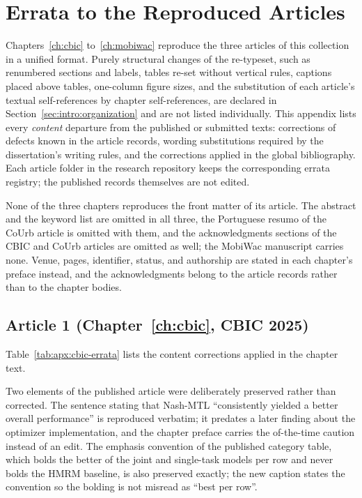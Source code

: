 
\chapter{Errata to the Reproduced Articles}
\label{apx:errata}

Chapters~\ref{ch:cbic} to~\ref{ch:mobiwac} reproduce the three articles of this
collection in a unified format. Purely structural changes of the re-typeset, such as
renumbered sections and labels, tables re-set without vertical rules, captions placed
above tables, one-column figure sizes, and the substitution of each article's textual
self-references by chapter self-references, are declared in
Section~\ref{sec:intro:organization} and are
not listed individually. This appendix lists every \emph{content} departure from the
published or submitted texts: corrections of defects known in the article records,
wording substitutions required by the dissertation's writing rules, and the
corrections applied in the global bibliography. Each article folder in the research
repository keeps the corresponding errata registry; the published records themselves
are not edited.

None of the three chapters reproduces the front matter of its article. The abstract and
the keyword list are omitted in all three, the Portuguese resumo of the CoUrb article is
omitted with them, and the acknowledgments sections of the CBIC and CoUrb articles are
omitted as well; the MobiWac manuscript carries none. Venue, pages, identifier, status,
and authorship are stated in each chapter's preface instead, and the acknowledgments
belong to the article records rather than to the chapter bodies.

\section{Article 1 (Chapter~\ref{ch:cbic}, CBIC 2025)}
\label{apx:errata:cbic}

Table~\ref{tab:apx:cbic-errata} lists the content corrections applied in the chapter
text.



Two elements of the published article were deliberately preserved rather than
corrected. The sentence stating that Nash-MTL ``consistently yielded a better
overall performance'' is reproduced verbatim; it predates a later finding about the
optimizer implementation, and the chapter preface carries the of-the-time caution
instead of an edit.
The emphasis convention of the published category table, which
bolds the better of the joint and single-task models per row and never bolds the HMRM
baseline, is also preserved exactly; the new caption states the convention so the
bolding is not misread as ``best per row''.

